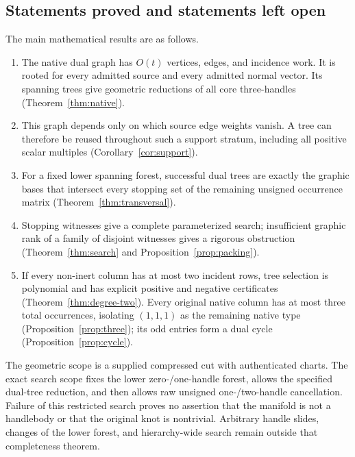\subsection{Statements proved and statements left open}
The main mathematical results are as follows.
\begin{enumerate}
\item The native dual graph has $O(t)$ vertices, edges, and incidence work.
  It is rooted for every admitted source and every admitted normal vector.
  Its spanning trees give geometric reductions of all core three-handles
  (Theorem~\ref{thm:native}).
\item This graph depends only on which source edge weights vanish.  A tree
  can therefore be reused throughout such a support stratum, including all
  positive scalar multiples (Corollary~\ref{cor:support}).
\item For a fixed lower spanning forest, successful dual trees are exactly
  the graphic bases that intersect every stopping set of the remaining
  unsigned occurrence matrix (Theorem~\ref{thm:transversal}).
\item Stopping witnesses give a complete parameterized search; insufficient
  graphic rank of a family of disjoint witnesses gives a rigorous obstruction
  (Theorem~\ref{thm:search} and Proposition~\ref{prop:packing}).
\item If every non-inert column has at most two incident rows, tree selection
  is polynomial and has explicit positive and negative certificates
  (Theorem~\ref{thm:degree-two}).  Every original native column has at most
  three total occurrences, isolating $(1,1,1)$ as the remaining native
  type (Proposition~\ref{prop:three}); its odd entries form a dual cycle
  (Proposition~\ref{prop:cycle}).
\end{enumerate}
The geometric scope is a supplied compressed cut with authenticated charts.
The exact search scope fixes the lower zero-/one-handle forest, allows the
specified dual-tree reduction, and then allows raw unsigned one-/two-handle
cancellation.  Failure of this restricted search proves no assertion that
the manifold is not a handlebody or that the original knot is nontrivial.
Arbitrary handle slides, changes of the lower forest, and hierarchy-wide
search remain outside that completeness theorem.
